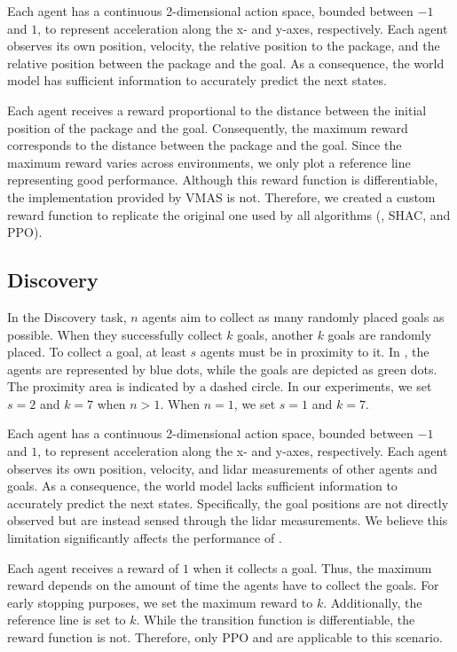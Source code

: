 Each agent has a continuous 2-dimensional action space, bounded between $-1$ and $1$, to represent acceleration along the x- and y-axes, respectively. Each agent observes its own position, velocity, the relative position to the package, and the relative position between the package and the goal. As a consequence, the world model has sufficient information to accurately predict the next states.

Each agent receives a reward proportional to the distance between the initial position of the package and the goal. Consequently, the maximum reward corresponds to the distance between the package and the goal. Since the maximum reward varies across environments, we only plot a reference line representing good performance. Although this reward function is differentiable, the implementation provided by VMAS is not. Therefore, we created a custom reward function to replicate the original one used by all algorithms (\fname{}, SHAC, and PPO).


\subsection{Discovery}
In the Discovery task, $n$ agents aim to collect as many randomly placed goals as possible. When they successfully collect $k$ goals, another $k$ goals are randomly placed. To collect a goal, at least $s$ agents must be in proximity to it. In , the agents are represented by blue dots, while the goals are depicted as green dots. The proximity area is indicated by a dashed circle. In our experiments, we set $s=2$ and $k=7$ when $n > 1$. When $n = 1$, we set $s=1$ and $k=7$.

Each agent has a continuous 2-dimensional action space, bounded between $-1$ and $1$, to represent acceleration along the x- and y-axes, respectively. Each agent observes its own position, velocity, and lidar measurements of other agents and goals. As a consequence, the world model lacks sufficient information to accurately predict the next states. Specifically, the goal positions are not directly observed but are instead sensed through the lidar measurements. We believe this limitation significantly affects the performance of \fname{}.

Each agent receives a reward of $1$ when it collects a goal. Thus, the maximum reward depends on the amount of time the agents have to collect the goals. For early stopping purposes, we set the maximum reward to $k$. Additionally, the reference line is set to $k$. While the transition function is differentiable, the reward function is not. Therefore, only PPO and \fname{} are applicable to this scenario.

